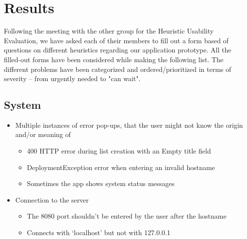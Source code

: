 \section{Results}

Following the meeting with the other group for the Heuristic Usability Evaluation, we have asked each of their members to fill out a form based of questions on different heuristics regarding our application prototype. All the filled-out forms have been considered while making the following list. The different problems have been categorized and ordered/prioritized in terms of severity – from urgently needed to "can wait".
\subsection{System}
\begin{itemize}
    \item Multiple instances of error pop-ups, that the user might not know the origin and/or meaning of
    \begin{itemize}
        \item 400 HTTP error during list creation with an Empty title field
        \item DeploymentException error when entering an invalid hostname
        \item Sometimes the app shows system status messages
    \end{itemize}
    \item Connection to the server
    \begin{itemize}
        \item The 8080 port shouldn’t be entered by the user after the hostname
        \item Connects with ‘localhost’ but not with 127.0.0.1
    \end{itemize}
\end{itemize}


